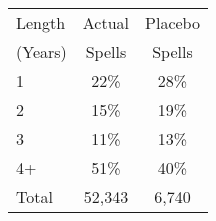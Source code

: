 \begin{tabular}{lcc}
\toprule
Length & Actual & Placebo \\
(Years) & Spells & Spells \\
\midrule
1 & 22\% & 28\% \\
2 & 15\% & 19\% \\
3 & 11\% & 13\% \\
4+ & 51\% & 40\% \\
Total &       52,343 &        6,740 \\
\bottomrule
\end{tabular}
